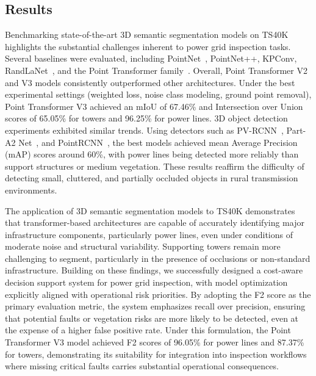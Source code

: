 \subsection{Results}

Benchmarking state-of-the-art 3D semantic segmentation models on TS40K
highlights the substantial challenges inherent to power grid inspection tasks.
Several baselines were evaluated, including PointNet~\cite{qi2017pointnet},
PointNet++\cite{qi2017pointnet++}, KPConv\cite{thomas2019kpconv},
RandLaNet~\cite{hu2020randla}, and the Point Transformer
family~\cite{zhao2021point}.
%
Overall, Point Transformer V2 and V3 models consistently outperformed other
architectures. Under the best experimental settings (weighted loss, noise class
modeling, ground point removal), Point Transformer V3 achieved an mIoU of
67.46\% and Intersection over Union scores of 65.05\% for towers and 96.25\%
for power lines.
%
3D object detection experiments exhibited similar trends. Using detectors such as
PV-RCNN~\cite{shi2020pv}, Part-A2 Net~\cite{shi2020points}, and
PointRCNN~\cite{shi2019pointrcnn}, the best models achieved mean Average Precision
(mAP) scores around 60\%, with power lines being detected more reliably than support
structures or medium vegetation. These results reaffirm the difficulty of detecting
small, cluttered, and partially occluded objects in rural transmission environments.

The application of 3D semantic segmentation models to TS40K demonstrates that
transformer-based architectures are capable of accurately identifying major
infrastructure components, particularly power lines, even under conditions of
moderate noise and structural variability.
%
Supporting towers remain more challenging to segment, particularly in the
presence of occlusions or non-standard infrastructure.
%
Building on these findings, we successfully designed a cost-aware decision
support system for power grid inspection, with model optimization explicitly
aligned with operational risk priorities. By adopting the F2 score as the
primary evaluation metric, the system emphasizes recall over precision,
ensuring that potential faults or vegetation risks are more likely to be
detected, even at the expense of a higher false positive rate. Under this
formulation, the Point Transformer V3 model achieved F2 scores of 96.05\% for
power lines and 87.37\% for towers, demonstrating its suitability for
integration into inspection workflows where missing critical faults carries
substantial operational consequences.

